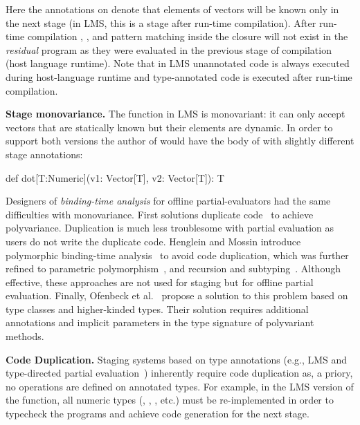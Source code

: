 Here the  annotations on  denote that elements of vectors will be known only in the next stage (in LMS, this is a stage after run-time compilation). After run-time compilation ,
 , and pattern matching inside the closure will not exist in the \emph{residual} program
 as they were evaluated in the previous stage of compilation (host language runtime). Note that in
 LMS unannotated code is always executed during host-language runtime
 and type-annotated code is executed after run-time compilation.

{\bf Stage monovariance.} The  function in LMS is monovariant: it can only
 accept vectors that are statically known but their elements are dynamic. In order
 to support both versions the author of  would have the body of
  with slightly different stage annotations: \begin{lstparagraph}
def dot[T:Numeric](v1: Vector[T], v2: Vector[T]): T
 \end{lstparagraph}

Designers of \emph{binding-time analysis} for offline partial-evaluators had the
same difficulties with monovariance. First solutions duplicate
code~\cite{rytz1992polyvariant} to achieve polyvariance. Duplication is  much
less troublesome with partial evaluation as users do not write the duplicate
code.  Henglein and Mossin introduce polymorphic binding-time
analysis~\cite{henglein1994polymorphic} to avoid code duplication, which was further refined to parametric
polymorphism~\cite{heldal2001binding}, and recursion and subtyping~\cite{dussart1995polymorphic}. Although effective,
these approaches are not used for staging but for offline partial evaluation. Finally, Ofenbeck et
al.~\cite{ofenbeck2013spiral} propose a solution to this problem based on type
classes and higher-kinded types. Their solution requires additional annotations
and implicit parameters in the type signature of polyvariant methods.

{\bf Code Duplication.} Staging systems based on type annotations (e.g., LMS and type-directed
partial evaluation~\cite{danvy1999type}) inherently require code duplication as,
a priory, no operations are defined on  annotated types. For example,
in the LMS version of the  function, all numeric types (\ie, , , etc.)
must be re-implemented in order to typecheck the programs and achieve code generation
for the next stage.

